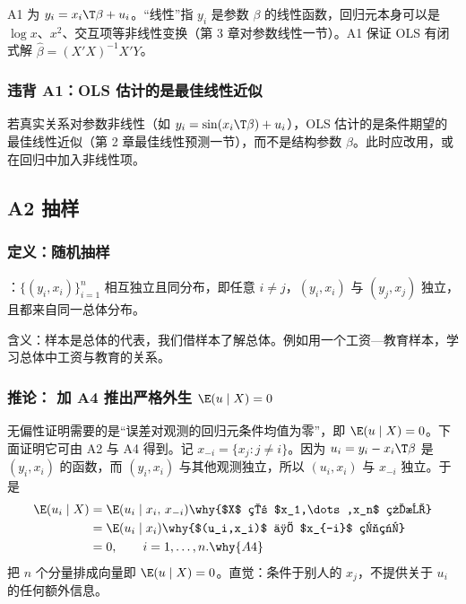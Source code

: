 A1 为 $y_i=x_i\T\beta+u_i$。“线性”指 $y_i$ 是参数 $\beta$ 的线性函数，回归元本身可以是 $\log x$、$x^2$、交互项等非线性变换（第 3 章对参数线性一节）。A1 保证 OLS 有闭式解 $\hat\beta=(X'X)^{-1}X'Y$。

\subsubsection{违背 A1：OLS 估计的是最佳线性近似}

若真实关系对参数非线性（如 $y_i=\sin(x_i\T\beta)+u_i$），OLS 估计的是条件期望的最佳线性近似（第 2 章最佳线性预测一节），而不是结构参数 $\beta$。此时应改用，或在回归中加入非线性项。

\subsection{A2 \texorpdfstring{\iid}{i.i.d.} 抽样}

\subsubsection{定义：随机抽样}

\begin{defn}[随机抽样]\label{def:U04-rs}
：$\{(y_i,x_i)\}_{i=1}^n$ 相互独立且同分布，即任意 $i\neq j$，$(y_i,x_i)$ 与 $(y_j,x_j)$ 独立，且都来自同一总体分布。
\end{defn}

含义：样本是总体的代表，我们借样本了解总体。例如用一个工资—教育样本，学习总体中工资与教育的关系。

\subsubsection{推论：\texorpdfstring{\iid}{i.i.d.} 加 A4 推出严格外生 \texorpdfstring{$\E(u\mid X)=0$}{E(u|X)=0}}

无偏性证明需要的是“误差对观测的回归元条件均值为零”，即 $\E(u\mid X)=0$。下面证明它可由 A2 与 A4 得到。记 $x_{-i}=\{x_j:j\neq i\}$。因为 $u_i=y_i-x_i\T\beta$ 是 $(y_i,x_i)$ 的函数，而 $(y_i,x_i)$ 与其他观测独立，所以 $(u_i,x_i)$ 与 $x_{-i}$ 独立。于是
\begin{align*}
\E(u_i\mid X) &= \E(u_i\mid x_i,\,x_{-i}) \why{$X$ 由 $x_1,\dots,x_n$ 组成}\\
&= \E(u_i\mid x_i) \why{$(u_i,x_i)$ 与 $x_{-i}$ 独立}\\
&= 0,\qquad i=1,\dots,n. \why{A4}
\end{align*}
把 $n$ 个分量排成向量即 $\E(u\mid X)=0$。直觉：条件于别人的 $x_j$，不提供关于 $u_i$ 的任何额外信息。

